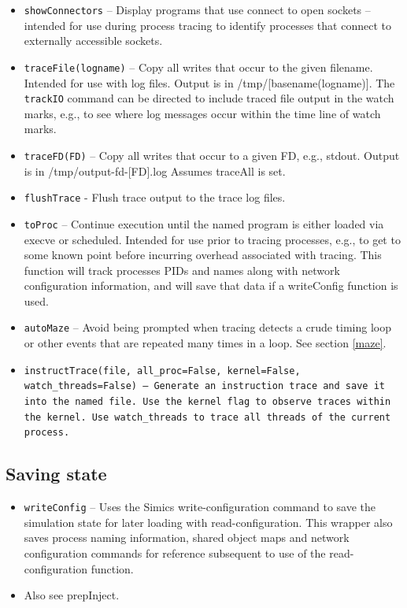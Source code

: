 \documentclass[titlepage]{article}
\begin{document}
\begin{itemize}
\item {\tt showConnectors} – Display programs that use connect to open sockets – intended for use during process tracing to identify processes that connect to externally accessible sockets.

\item {\tt traceFile(logname)} – Copy all writes that occur to the given filename.  Intended for use with log files.  Output is in /tmp/[basename(logname)].
The {\tt trackIO} command can be directed to include traced file output in the watch marks, e.g., to see where log messages occur within the
time line of watch marks.

\item {\tt traceFD(FD)} – Copy all writes that occur to a given FD, e.g., stdout.  Output is in /tmp/output-fd-[FD].log   Assumes traceAll is set.

\item {\tt flushTrace} - Flush trace output to the trace log files.

\item {\tt toProc} – Continue execution until the named program is either loaded via execve or scheduled.  Intended for use prior to tracing processes, e.g., to get to some known point before incurring overhead associated with tracing.   This function will track processes PIDs and names along with network configuration information, and will save that data if a writeConfig function is used.

\item {\tt autoMaze} -- Avoid being prompted when tracing detects a crude timing loop or other events that are repeated many times in a loop.
See section \ref{maze}.

\item {\tt instructTrace(file, all\_proc=False, kernel=False, watch\_threads=False) -- Generate an instruction trace and save it into the named file. Use the kernel
flag to observe traces within the kernel. Use {\tt watch\_threads} to trace all threads of the current process.}
\end{itemize}


\subsection{Saving state}
\begin{itemize}
\item {\tt writeConfig} – Uses the Simics write-configuration command to save the simulation state for later loading with read-configuration.  This wrapper also saves process naming information, shared object maps and network configuration commands for reference subsequent to use of the read-configuration function.
\item Also see prepInject.
\end{itemize}
\end{document}
